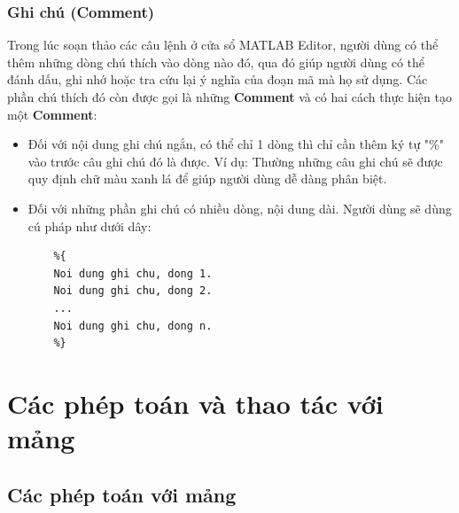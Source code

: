 \documentclass[12pt,a4paper]{article}
\begin{document}
\subsubsection{Ghi chú (Comment)}
Trong lúc soạn thảo các câu lệnh ở cửa sổ MATLAB Editor, người dùng có thể thêm những dòng chú thích vào dòng nào đó, qua đó giúp người dùng có thể đánh dấu, ghi nhớ hoặc tra cứu lại ý nghĩa của đoạn mã mà họ sử dụng. Các phần chú thích đó còn được gọi là những \textbf{Comment} và có hai cách thực hiện tạo một \textbf{Comment}:
\begin{itemize}
	\item Đối với nội dung ghi chú ngắn, có thể chỉ 1 dòng thì chỉ cần thêm ký tự "\%" vào trước câu ghi chú đó là được. Ví dụ: \textcolor{green}{} Thường những câu ghi chú sẽ được quy định chữ màu xanh lá để giúp người dùng dễ dàng phân biệt.
	\item Đối với những phần ghi chú có nhiều dòng, nội dung dài. Người dùng sẽ dùng cú pháp như dưới dây:
\begin{lstlisting}
	%{
	Noi dung ghi chu, dong 1.
	Noi dung ghi chu, dong 2.
	...
	Noi dung ghi chu, dong n.
	%}
\end{lstlisting}
\end{itemize}
\section{Các phép toán và thao tác với mảng}
\subsection{Các phép toán với mảng}
\end{document}

